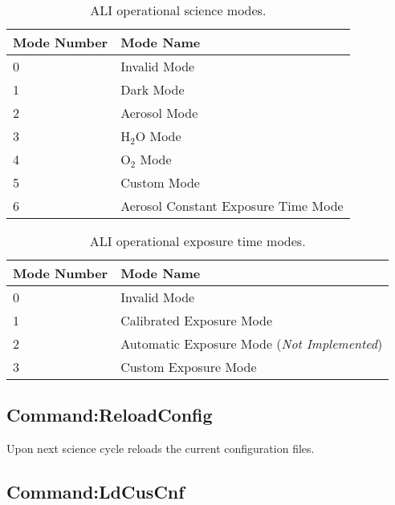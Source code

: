 \begin{table}
    \begin{center}
    \begin{tabular}{|l|l|}
    \hline
    Mode Number & Mode Name \\
    \hline
    0 & Invalid Mode \\
    \hline
    1 & Dark Mode \\
    \hline
    2 & Aerosol Mode \\
    \hline
    3 & H$_{2}$O Mode \\
    \hline
    4 & O$_{2}$ Mode \\
    \hline
    5 & Custom Mode \\
    \hline
    6 & Aerosol Constant Exposure Time Mode \\
    \hline
    \end{tabular}
    \end{center}
    \caption[ALI Operational Science Modes]{ALI operational science modes.}
    \label{tab:B.1:ScienceModes}
\end{table}


\begin{table}
    \begin{center}
    \begin{tabular}{|l|l|}
    \hline
    Mode Number & Mode Name \\
    \hline
    0 & Invalid Mode \\
    \hline
    1 & Calibrated Exposure Mode \\
    \hline
    2 & Automatic Exposure Mode (\textit{Not Implemented}) \\
    \hline
    3 & Custom Exposure Mode \\
    \hline
    \end{tabular}
    \end{center}
    \caption[ALI Operational Exposure Time Modes]{ALI operational exposure time modes.}
    \label{tab:B.1:ExposureModes}
\end{table}

\subsection{Command:ReloadConfig}

Upon next science cycle reloads the current configuration files.

\subsection{Command:LdCusCnf}

